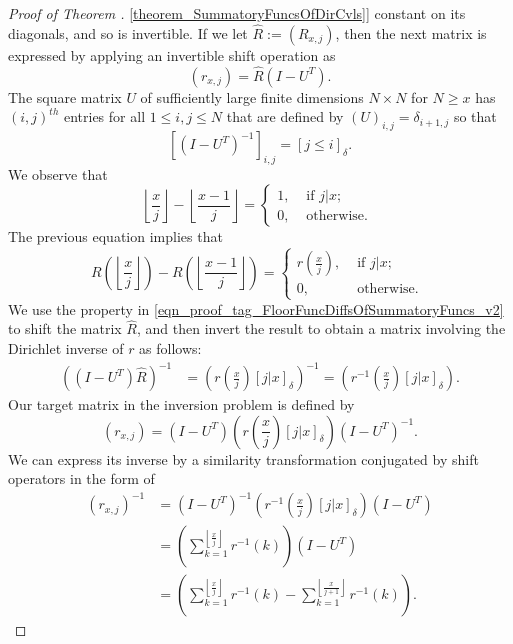 \documentclass[11pt,reqno,a4letter]{article}
\newcommand{\hlocalref}[1]{\hyperref[#1]{\ref{#1}}}
\numberwithin{equation}{section}
\numberwithin{figure}{section}
\numberwithin{table}{section}
\newcommand{\Iverson}[1]{\ensuremath{\left[#1\right]_{\delta}}}
\newcommand{\floor}[1]{\left\lfloor #1 \right\rfloor}
\newcommand{\Floor}[2]{\ensuremath{\left\lfloor \frac{#1}{#2} \right\rfloor}}
\theoremstyle{plain}
\numberwithin{theorem}{section}
\theoremstyle{definition}
\begin{document}
\begin{proof}[Proof of Theorem \hlocalref{theorem_SummatoryFuncsOfDirCvls}]
constant on its diagonals, and so is invertible. 
If we let $\hat{R} := (R_{x,j})$, then the next matrix is 
expressed by applying an invertible shift operation as 
\[
(r_{x,j}) = \hat{R} \left(I - U^{T}\right). 
\]
The square matrix $U$ of sufficiently large finite dimensions $N \times N$ for $N \geq x$ 
has $(i,j)^{th}$ entries for all $1 \leq i,j \leq N$ that are defined by 
$(U)_{i,j} = \delta_{i+1,j}$ so that 
\[
\left[\left(I - U^T\right)^{-1}\right]_{i,j} = \Iverson{j \leq i}. 
\]
We observe that 
\[
\Floor{x}{j} - \Floor{x-1}{j} = \begin{cases} 
     1, & \text{ if $j|x$; } \\ 
     0, & \text{ otherwise. } 
     \end{cases} 
\] 
The previous equation implies that 
\begin{equation} 
\label{eqn_proof_tag_FloorFuncDiffsOfSummatoryFuncs_v2} 
R\left(\floor{\frac{x}{j}}\right) - R\left(\floor{\frac{x-1}{j}}\right) = 
     \begin{cases} 
     r\left(\frac{x}{j}\right), & \text{ if $j | x$; } \\ 
     0, & \text{ otherwise. } 
     \end{cases}
\end{equation} 
We use the property in \eqref{eqn_proof_tag_FloorFuncDiffsOfSummatoryFuncs_v2} 
to shift the matrix $\hat{R}$, and then invert the result to obtain a matrix involving the 
Dirichlet inverse of $r$ as follows: 
\begin{align*} 
\left(\left(I-U^{T}\right) \hat{R}\right)^{-1} & = 
     \left(r\left(\frac{x}{j}\right) \Iverson{j|x}\right)^{-1} = 
     \left(r^{-1}\left(\frac{x}{j}\right) \Iverson{j|x}\right). 
\end{align*} 
Our target matrix in the inversion problem is defined by 
$$(r_{x,j}) = \left(I-U^{T}\right) \left(r\left(\frac{x}{j}\right) \Iverson{j|x}\right) \left(I-U^{T}\right)^{-1}.$$
We can express its inverse by a similarity transformation conjugated by shift operators in the form of 
\begin{align*} 
(r_{x,j})^{-1} & = \left(I-U^{T}\right)^{-1} \left(r^{-1}\left(\frac{x}{j}\right) 
     \Iverson{j|x}\right) \left(I-U^{T}\right) \\ 
     & = \left(\sum_{k=1}^{\floor{\frac{x}{j}}} r^{-1}(k)\right) \left(I-U^{T}\right) \\ 
     & = \left(\sum_{k=1}^{\floor{\frac{x}{j}}} r^{-1}(k) - \sum_{k=1}^{\floor{\frac{x}{j+1}}} r^{-1}(k)\right). 
\end{align*} 

\end{proof}
\end{document}
